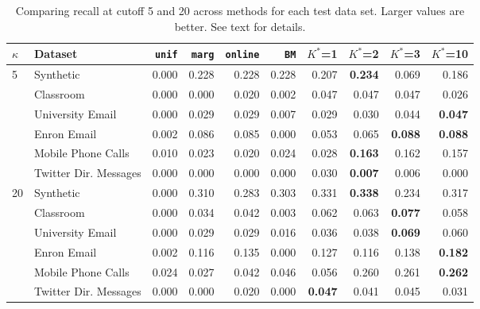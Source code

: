 \begin{table*}[t]
\begin{center}
{\footnotesize
\begin{tabular}{llrrrrrrrr}
  \hline
$\kappa$ & Dataset & \texttt{unif} & \texttt{marg} & \texttt{online} & \texttt{BM} & $K^*$=1 & $K^*$=2 & $K^*$=3 & $K^*$=10 \\ 
  \hline
5 & Synthetic & 0.000 & 0.228 & 0.228 & 0.228 & 0.207 & \textbf{0.234} & 0.069 & 0.186 \\ 
   & Classroom & 0.000 & 0.000 & 0.020 & 0.002 & 0.047 & 0.047 & 0.047 & 0.026 \\ 
   & University Email & 0.000 & 0.029 & 0.029 & 0.007 & 0.029 & 0.030 & 0.044 & \textbf{0.047} \\ 
   & Enron Email & 0.002 & 0.086 & 0.085 & 0.000 & 0.053 & 0.065 & \textbf{0.088} & \textbf{0.088} \\ 
   & Mobile Phone Calls & 0.010 & 0.023 & 0.020 & 0.024 & 0.028 & \textbf{0.163} & 0.162 & 0.157 \\ 
   & Twitter Dir. Messages & 0.000 & 0.000 & 0.000 & 0.000 & 0.030 & \textbf{0.007} & 0.006 & 0.000 \\ 
  20 & Synthetic & 0.000 & 0.310 & 0.283 & 0.303 & 0.331 & \textbf{0.338} & 0.234 & 0.317 \\ 
   & Classroom & 0.000 & 0.034 & 0.042 & 0.003 & 0.062 & 0.063 & \textbf{0.077} & 0.058 \\ 
   & University Email & 0.000 & 0.029 & 0.029 & 0.016 & 0.036 & 0.038 & \textbf{0.069} & 0.060 \\ 
   & Enron Email & 0.002 & 0.116 & 0.135 & 0.000 & 0.127 & 0.116 & 0.138 & \textbf{0.182} \\ 
   & Mobile Phone Calls & 0.024 & 0.027 & 0.042 & 0.046 & 0.056 & 0.260 & 0.261 & \textbf{0.262} \\ 
   & Twitter Dir. Messages & 0.000 & 0.000 & 0.020 & 0.000 & \textbf{0.047} & 0.041 & 0.045 & 0.031 \\ 
   \hline
\end{tabular}
}
\caption{Comparing recall at cutoff 5 and 20 across methods for each test data set.  Larger values are better.  See text for details.}
\label{tab:recall20}
\end{center}
\end{table*}
